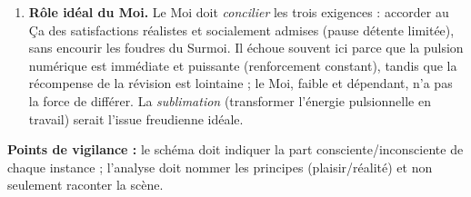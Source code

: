 \documentclass[11pt]{article}
\begin{document}
\begin{corrige}
\begin{enumerate}
    \item \textbf{Rôle idéal du Moi.} Le Moi doit \emph{concilier} les trois exigences : accorder au Ça des satisfactions réalistes et socialement admises (pause détente limitée), sans encourir les foudres du Surmoi. Il échoue souvent ici parce que la pulsion numérique est immédiate et puissante (renforcement constant), tandis que la récompense de la révision est lointaine ; le Moi, faible et dépendant, n'a pas la force de différer. La \emph{sublimation} (transformer l'énergie pulsionnelle en travail) serait l'issue freudienne idéale.
\end{enumerate}
\textbf{Points de vigilance :} le schéma doit indiquer la part consciente/inconsciente de chaque instance ; l'analyse doit nommer les principes (plaisir/réalité) et non seulement raconter la scène.
\end{corrige}
\end{document}
